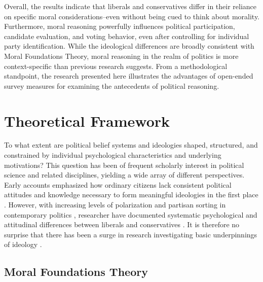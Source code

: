 \documentclass[12pt]{article}
\begin{document}
Overall, the results indicate that liberals and conservatives differ in their reliance on specific moral considerations--even without being cued to think about morality. Furthermore, moral reasoning powerfully influences political participation, candidate evaluation, and voting behavior, even after controlling for individual party identification. While the ideological differences are broadly consistent with Moral Foundations Theory, moral reasoning in the realm of politics is more context-specific than previous research suggests. From a methodological standpoint, the research presented here illustrates the advantages of open-ended survey measures for examining the antecedents of political reasoning.


\section{Theoretical Framework}

To what extent are political belief systems and ideologies shaped, structured, and constrained by individual psychological characteristics and underlying motivations? This question has been of frequent scholarly interest in political science and related disciplines, yielding a wide array of different perspectives. Early accounts emphasized how ordinary citizens lack consistent political attitudes and knowledge necessary to form meaningful ideologies in the first place \citep[e.g.][]{converse1964nature}. However, with increasing levels of polarization and partisan sorting in contemporary politics \citep[e.g.][]{iyengar2015fear}, researcher have documented systematic psychological and attitudinal differences between liberals and conservatives \citeyearpar[c.f.][]{jost2006end}. It is therefore no surprise that there has been a surge in research investigating basic underpinnings of ideology \citep[see also][]{jost2003political,jost2009political}.


\subsection{Moral Foundations Theory}
\end{document}
